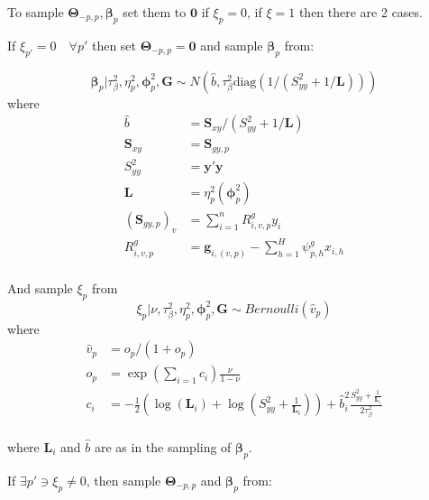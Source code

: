 \documentclass[
]{article}
\begin{document}
To sample \( {\boldsymbol \Theta} _{-p,p},  {\boldsymbol \beta} _p\) set them to \( {\boldsymbol 0} \) if \(\xi_p = 0\), if
\(\xi=1\) then there are 2 cases.

If \(\xi_{p'} = 0 \quad \forall p'\) then set \( {\boldsymbol \Theta} _{-p,p} =  {\boldsymbol 0} \) and sample \( {\boldsymbol \beta} _p\) from:

\[  {\boldsymbol \beta} _p |\tau_\beta^2, \eta_p^2,  {\boldsymbol \phi} _p^2,  {\boldsymbol G} \sim N(\hat{b}, \tau_\beta^2 \text{diag}(1/(S_{yy}^2 + 1 /  {\boldsymbol L} )) )\]
where
\begin{align*}
    \hat{b}           &=  {\boldsymbol S} _{xy} / (S_{yy}^2 + 1 /  {\boldsymbol L} )                   \\
     {\boldsymbol S} _{xy}          &=  {\boldsymbol S} _{gy,p}                                        \\
    S_{yy}^2          &=  {\boldsymbol y} ' {\boldsymbol y} \\
     {\boldsymbol L} &= \eta_p^2 ( {\boldsymbol \phi} _p^2)                              \\
    ( {\boldsymbol S} _{gy,p})_{v}  &= \sum_{i=1}^n R_{i,v,p}^g y_i                      \\
    R_{i,v,p}^g       &=  {\boldsymbol g} _{i,(v,p)} - \sum_{h=1}^H \psi^g_{p,h} x_{i,h} \\
\end{align*}

And sample \(\xi_p\) from
\[ \xi_p|\nu, \tau_\beta^2, \eta_p^2,  {\boldsymbol \phi} _p^2, {\boldsymbol G} \sim Bernoulli(\hat{v}_p)\]
where
\begin{align*}
    \hat{v}_p &= o_p / (1 + o_p) \\
    o_p       &= \exp(\sum_{i=1} c_i) \frac{\nu}{1-\nu}\\
    c_i       &= -\frac{1}{2} \left(\log( {\boldsymbol L} _i) + \log\left(S_{yy}^2 +\frac{1}{ {\boldsymbol L} _i}\right) \right) + \hat{b}^2_i \frac{S_{yy}^2 +\frac{1}{ {\boldsymbol L} _i}}{2\tau_\beta^2}\\
\end{align*}

where \( {\boldsymbol L} _i\) and \(\hat{b}\) are as in the sampling of \( {\boldsymbol \beta} _p\).

If \(\exists p' \ni \xi_p \neq0\), then sample \( {\boldsymbol \Theta} _{-p,p}\) and \( {\boldsymbol \beta} _p\) from:
\end{document}
